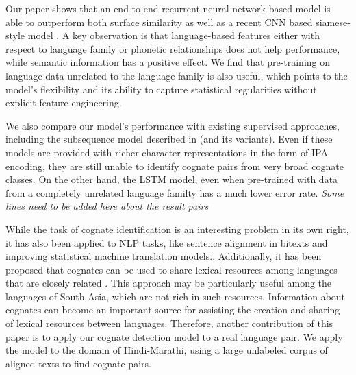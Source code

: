 \documentclass[11pt,letterpaper]{article}
\begin{document}

Our paper shows that an end-to-end recurrent neural network based model is able to outperform both surface similarity as well as a recent CNN based siamese-style model \citep{rama2016siamese}. A key observation is that language-based features either with respect to language family or phonetic relationships does not help performance, while semantic information has a positive effect. We find that pre-training on language data unrelated to the language family is also useful, which points to the model's flexibility and its ability to capture statistical regularities without explicit feature engineering.

We also compare our model's performance with existing supervised approaches, including the subsequence model described in \citep{rama2015automatic} (and its variants). Even if these models are provided with richer character representations in the form of IPA encoding, they are still unable to identify cognate pairs from very broad cognate classes. On the other hand, the LSTM model, even when pre-trained with data from a completely unrelated language familty has a much lower error rate.  \textit{Some lines need to be added here about the result pairs}



While the task of cognate identification is an interesting problem in its own right, it has also been applied to NLP tasks, like sentence alignment in bitexts and improving statistical machine translation models.\citep{Kondrak:2003,Simard:1993:UCA:962367.962411}. Additionally, it has been proposed that cognates can be used to share lexical resources among languages that are closely related \citep{Singh:07b}. This approach may be particularly useful among the languages of South Asia, which are not rich in such resources. Information about cognates can become an important source for assisting the creation and sharing of lexical resources between languages. Therefore, another contribution of this paper is to apply our cognate detection model to a real language pair. We apply the model to the domain of Hindi-Marathi, using a large unlabeled corpus of aligned texts to find cognate pairs.
\end{document}
